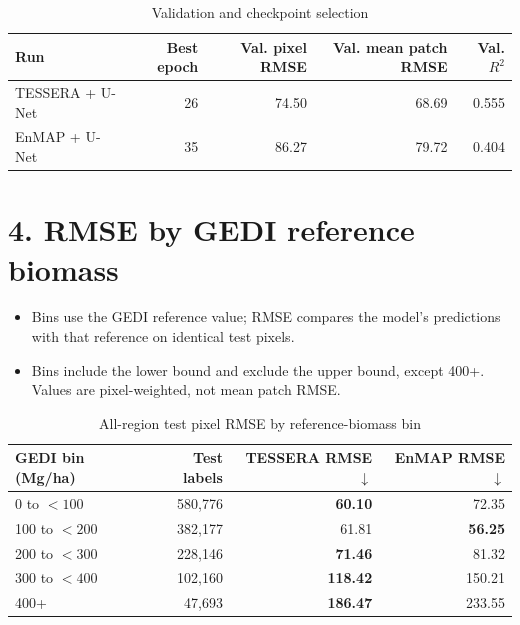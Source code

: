 \documentclass[11pt]{article}
\begin{document}
\begin{table}[H]
	\centering
	\caption{Validation and checkpoint selection}
	\small
	\begin{tabular}{@{}lrrrr@{}}
		\toprule
		Run             & Best epoch & Val. pixel RMSE & Val. mean patch RMSE & Val. $R^2$ \\
		\midrule
		TESSERA + U-Net & 26         & 74.50           & 68.69                & 0.555      \\
		EnMAP + U-Net   & 35         & 86.27           & 79.72                & 0.404      \\
		\bottomrule
	\end{tabular}
\end{table}

\section*{4. RMSE by GEDI reference biomass}
\begin{itemize}
	\item Bins use the GEDI reference value; RMSE compares the model's predictions with that reference on identical test pixels.
	\item Bins include the lower bound and exclude the upper bound, except 400+. Values are pixel-weighted, not mean patch RMSE.
\end{itemize}

\begin{table}[H]
	\centering
	\caption{All-region test pixel RMSE by reference-biomass bin}
	\small
	\begin{tabular}{@{}lrrr@{}}
		\toprule
		GEDI bin (Mg/ha) & Test labels & TESSERA RMSE $\downarrow$ & EnMAP RMSE $\downarrow$ \\
		\midrule
		0 to $<100$      & 580,776     & \textbf{60.10}            & 72.35                   \\
		100 to $<200$    & 382,177     & 61.81                     & \textbf{56.25}          \\
		200 to $<300$    & 228,146     & \textbf{71.46}            & 81.32                   \\
		300 to $<400$    & 102,160     & \textbf{118.42}           & 150.21                  \\
		400+             & 47,693      & \textbf{186.47}           & 233.55                  \\
		\bottomrule
	\end{tabular}
\end{table}
\end{document}
